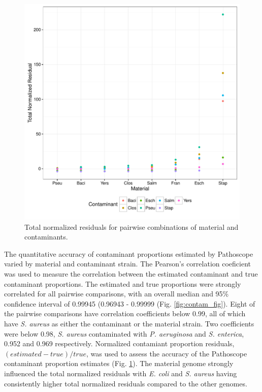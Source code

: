 \documentclass[fleqn,10pt,lineno]{wlpeerj}\usepackage[]{graphicx}\usepackage[]{color}
\makeatletter
\def\maxwidth{ %
  \ifdim\Gin@nat@width>\linewidth
    \linewidth
  \else
    \Gin@nat@width
  \fi
}
\newenvironment{knitrout}{}{} %
\makeatother
\begin{document}
\begin{knitrout}
\color{fgcolor}\begin{figure}
\includegraphics[width=\maxwidth]{figure/contam_resid-1} \caption[Total normalized residuals for pairwise combinations of material and contaminants]{Total normalized residuals for pairwise combinations of material and contaminants.}\label{fig:contam_resid}
\end{figure}


\end{knitrout}

The quantitative accuracy of contaminant proportions estimated by Pathoscope varied by material and contaminant strain.
The Pearson's correlation coeficient was used to measure the correlation between the estimated contaminant and true contaminant proportions. 
The estimated and true proportions were strongly correlated for all pairwise comparisons, with an overall median and 95\% confidence interval of 0.99945 (0.96943 - 0.99999 (Fig. \ref{fig:contam_fig}). 
Eight of the pairwise comparisons have correlation coefficients below 0.99, all of which have \textit{S. aureus} as either the contaminant or the material strain. 
Two coefficients were below 0.98, \textit{S. aureus} contaminated with \textit{P. aeruginosa} and \textit{S. enterica}, 0.952 and 0.969 respectively. 
Normalized contamiant proportion residuals, $(estimated-true)/true$, was used to assess the accuracy of the Pathoscope contaminant proportion estimates (Fig. \ref{fig:contam_resid}). 
The material genome strongly influenced the total normalized residuals with \textit{E. coli} and \textit{S. aureus} having consistently higher total normalized residuals compared to the other genomes. 
\end{document}
